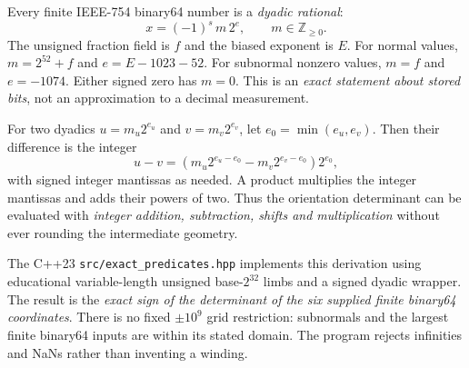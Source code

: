 \begin{booktwoproof}
Every finite IEEE-754 binary64 number is a \emph{dyadic rational}:
\[
 x=(-1)^s\,m\,2^e,\qquad m\in\mathbb{Z}_{\ge0}.
\]
The unsigned fraction field is \(f\) and the biased exponent is \(E\).
For normal values, \(m=2^{52}+f\) and
\(e=E-1023-52\). For subnormal nonzero values,
\(m=f\) and \(e=-1074\). Either signed zero has \(m=0\).
This is an \emph{exact statement about stored bits}, not an
approximation to a decimal measurement.

For two dyadics \(u=m_u2^{e_u}\) and
\(v=m_v2^{e_v}\), let \(e_0=\min(e_u,e_v)\).
Then their difference is the integer
\[
 u-v=\left(m_u2^{e_u-e_0}-m_v2^{e_v-e_0}\right)2^{e_0},
\]
with signed integer mantissas as needed. A product multiplies
the integer mantissas and adds their powers of two. Thus
the orientation determinant can be evaluated with
\emph{integer addition, subtraction, shifts and multiplication}
without ever rounding the intermediate geometry.

The C++23 \texttt{src/exact\_predicates.hpp} implements
this derivation using educational variable-length unsigned
base-\(2^{32}\) limbs and a signed dyadic wrapper.
The result is the \emph{exact sign of the determinant of
the six supplied finite binary64 coordinates}. There is
no fixed \(\pm10^9\) grid restriction: subnormals and the
largest finite binary64 inputs are within its stated domain.
The program rejects infinities and NaNs rather than
inventing a winding.
\end{booktwoproof}

